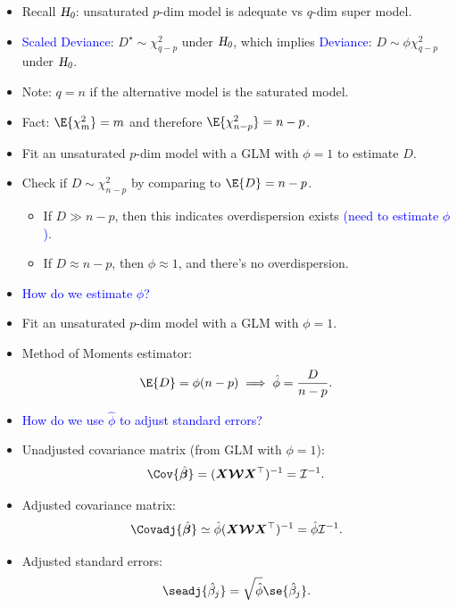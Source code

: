 \documentclass[oneside]{book}\usepackage[]{graphicx}\usepackage[svgnames]{xcolor}
\newcommand{\HN}{\textsl{H}_{\textsl{0}}}%
\providecommand{\Vector}[1]{\bm{#1}}%
\providecommand{\Matrix}[1]{\bm{#1}}
\providecommand{\MatrixCal}[1]{\bm{\mathcal{#1}}}
\begin{document}
\begin{itemize}
    \item Recall $ \HN $: unsaturated $ p $-dim model is adequate vs $ q $-dim super model.
    \item \textcolor{Blue}{Scaled Deviance}: $ D^\star \sim \chi^2_{q-p} $ under $ \HN $, which implies \textcolor{Blue}{Deviance}: $ D \sim \phi\chi^2_{q-p} $ under $ \HN $.
    \item Note: $ q=n $ if the alternative model is the saturated model.
    \item Fact: $ \E{\chi^2_{m}}=m $ and therefore $ \E{\chi^2_{n-p}}=n-p $.
    \item Fit an unsaturated $ p $-dim model with a GLM with $ \phi=1 $ to estimate $ D $.
    \item Check if $ D \sim \chi^2_{n-p} $ by comparing to $ \E{D}=n-p $.
          \begin{itemize}
              \item If $ D\gg n-p $, then this indicates overdispersion exists \textcolor{Blue}{(need to estimate $ \phi $)}.
              \item If $ D \approx n-p $, then $ \phi\approx 1 $, and there's no overdispersion.
          \end{itemize}
    \item \textcolor{Blue}{How do we estimate $ \phi $?}
    \item Fit an unsaturated $ p $-dim model with a GLM with $ \phi=1 $.
    \item Method of Moments estimator:
          \[ \E{D}=\phi(n-p)\implies \hat{\phi}=\frac{D}{n-p}. \]
    \item \textcolor{Blue}{How do we use $ \hat{\phi} $ to adjust standard errors?}
    \item Unadjusted covariance matrix (from GLM with $ \phi=1 $):
          \[ \Cov{\hat{\Vector{\beta}}}=(\Matrix{X}\MatrixCal{W}\Matrix{X}^\top)^{-1}=\mathcal{I}^{-1}. \]
    \item Adjusted covariance matrix:
          \[ \Covadj{\hat{\Vector{\beta}}}\simeq \hat{\phi} (\Matrix{X}\MatrixCal{W}\Matrix{X}^\top)^{-1}=\hat{\phi}\mathcal{I}^{-1}. \]
    \item Adjusted standard errors:
          \[ \seadj{\hat{\beta}_j}=\sqrt{\hat{\phi}}\se{\hat{\beta}_j}. \]
\end{itemize}
\end{document}
